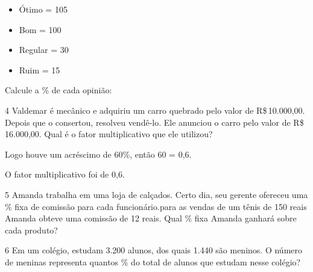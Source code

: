 \begin{itemize}
\item
  Ótimo = 105
\item
  Bom = 100
\item
  Regular = 30
\item
  Ruim = 15
\end{itemize}

Calcule a \% de cada opinião:







\num{4} Valdemar é mecânico e adquiriu um carro quebrado pelo valor de
R\$\,10.000,00. Depois que o consertou, resolveu vendê-lo. Ele anunciou o
carro pelo valor de R\$\,16.000,00. Qual é o fator multiplicativo que ele
utilizou?






Logo houve um acréscimo de 60\%, então 60  = 0,6.

O fator multiplicativo foi de 0,6.

\num{5} Amanda trabalha em uma loja de calçados. Certo dia, seu gerente
ofereceu uma \% fixa de comissão para cada funcionário.para as vendas de
um tênis de 150 reais Amanda obteve uma comissão de 12 reais. Qual \%
fixa Amanda ganhará sobre cada produto?





\num{6} Em um colégio, estudam 3.200 alunos, dos quais 1.440 são meninos. O
número de meninas representa quantos \% do total de alunos que estudam
nesse colégio?


